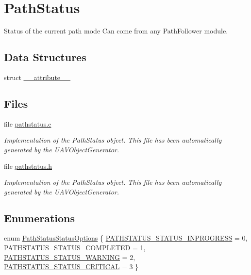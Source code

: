 \hypertarget{group___path_status}{\section{\-Path\-Status}
\label{group___path_status}
}


\-Status of the current path mode \-Can come from any \-Path\-Follower module.  


\subsection*{\-Data \-Structures}
\begin{DoxyCompactItemize}
\item 
struct \hyperlink{struct____attribute____}{\-\_\-\-\_\-attribute\-\_\-\-\_\-}
\end{DoxyCompactItemize}
\subsection*{\-Files}
\begin{DoxyCompactItemize}
\item 
file \hyperlink{pathstatus_8c}{pathstatus.\-c}
\begin{DoxyCompactList}\small\item\em \-Implementation of the \-Path\-Status object. \-This file has been automatically generated by the \-U\-A\-V\-Object\-Generator. \end{DoxyCompactList}\item 
file \hyperlink{pathstatus_8h}{pathstatus.\-h}
\begin{DoxyCompactList}\small\item\em \-Implementation of the \-Path\-Status object. \-This file has been automatically generated by the \-U\-A\-V\-Object\-Generator. \end{DoxyCompactList}\end{DoxyCompactItemize}
\subsection*{\-Enumerations}
\begin{DoxyCompactItemize}
\item 
enum \hyperlink{group___path_status_ga50f333bef7905171cfe26faf014f58f2}{\-Path\-Status\-Status\-Options} \{ \hyperlink{group___path_status_gga50f333bef7905171cfe26faf014f58f2ad1ee1098e3a380b0edb7296af6055b4d}{\-P\-A\-T\-H\-S\-T\-A\-T\-U\-S\-\_\-\-S\-T\-A\-T\-U\-S\-\_\-\-I\-N\-P\-R\-O\-G\-R\-E\-S\-S} = 0, 
\hyperlink{group___path_status_gga50f333bef7905171cfe26faf014f58f2a88fc917e59071cfa39d8419a0a57c813}{\-P\-A\-T\-H\-S\-T\-A\-T\-U\-S\-\_\-\-S\-T\-A\-T\-U\-S\-\_\-\-C\-O\-M\-P\-L\-E\-T\-E\-D} = 1, 
\hyperlink{group___path_status_gga50f333bef7905171cfe26faf014f58f2a060875b49100df766427066f740447e9}{\-P\-A\-T\-H\-S\-T\-A\-T\-U\-S\-\_\-\-S\-T\-A\-T\-U\-S\-\_\-\-W\-A\-R\-N\-I\-N\-G} = 2, 
\hyperlink{group___path_status_gga50f333bef7905171cfe26faf014f58f2a06d1abb3ef8e31a4eba5aa67029fa7be}{\-P\-A\-T\-H\-S\-T\-A\-T\-U\-S\-\_\-\-S\-T\-A\-T\-U\-S\-\_\-\-C\-R\-I\-T\-I\-C\-A\-L} = 3
 \}
\end{DoxyCompactItemize}
